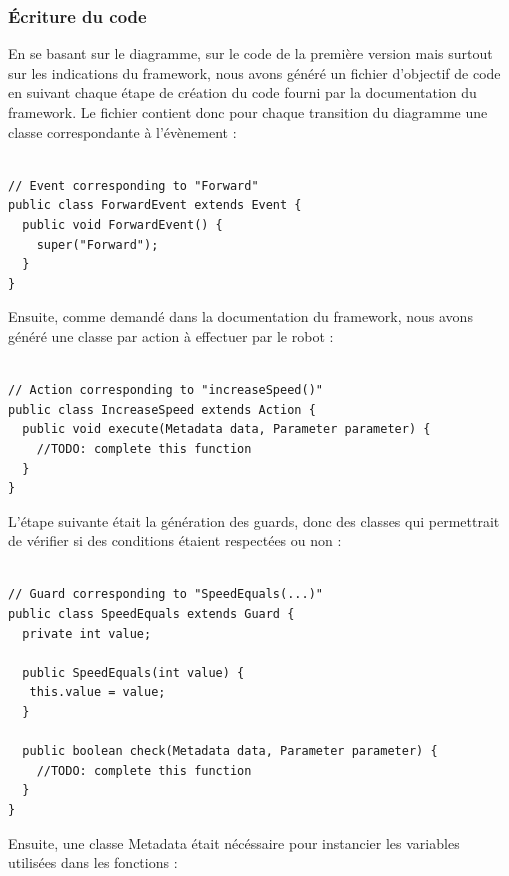 \documentclass[french, 12pt, a4paper]{article}
\begin{document}
    \subsubsection{Écriture du code}
    En se basant sur le diagramme, sur le code de la première version mais surtout sur les indications du framework, nous avons généré un fichier d'objectif de code en suivant chaque étape de création du code fourni par la documentation du framework. Le fichier contient donc pour chaque transition du diagramme une classe correspondante à l'évènement :
 
  \begin{lstlisting}[caption={Création d'une des classes évènement correspondantes aux transitions},basicstyle=\small]

// Event corresponding to "Forward"
public class ForwardEvent extends Event {
  public void ForwardEvent() {
    super("Forward");
  }
}
    \end{lstlisting}
    
    Ensuite, comme demandé dans la documentation du framework, nous avons généré une classe par action à effectuer par le robot : 
  
  \begin{lstlisting}[caption={Création d'une des classes correspondantes aux actions},basicstyle=\small]

// Action corresponding to "increaseSpeed()"
public class IncreaseSpeed extends Action {
  public void execute(Metadata data, Parameter parameter) {
    //TODO: complete this function
  }
}
    \end{lstlisting}
    
    L'étape suivante était la génération des guards, donc des classes qui permettrait de vérifier si des conditions étaient respectées ou non : 
    
  \begin{lstlisting}[caption={Création du seul guard que nous utilisons},basicstyle=\small]

// Guard corresponding to "SpeedEquals(...)"
public class SpeedEquals extends Guard {
  private int value;

  public SpeedEquals(int value) {
   this.value = value;
  }

  public boolean check(Metadata data, Parameter parameter) {
    //TODO: complete this function
  }
}
    \end{lstlisting}
    
    Ensuite, une classe Metadata était nécéssaire pour instancier les variables utilisées dans les fonctions : 
    
\end{document}
